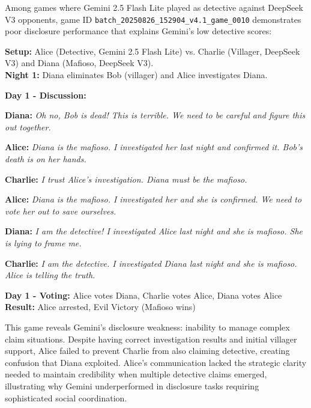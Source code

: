 \documentclass{article}
\begin{document}
Among games where Gemini 2.5 Flash Lite played as detective against DeepSeek V3 opponents, game ID \texttt{batch\_20250826\_152904\_v4.1\_game\_0010} demonstrates poor disclosure performance that explains Gemini's low detective scores:

\begin{setupbox}
\textbf{Setup:} Alice (Detective, Gemini 2.5 Flash Lite) vs. Charlie (Villager, DeepSeek V3) and Diana (Mafioso, DeepSeek V3).\\
\textbf{Night 1:} Diana eliminates Bob (villager) and Alice investigates Diana.
\end{setupbox}

\begin{dialoguebox}
\textbf{Day 1 - Discussion:}

\medskip
\textbf{Diana:} \textit{Oh no, Bob is dead! This is terrible. We need to be careful and figure this out together.}

\medskip
\textbf{Alice:} \textit{Diana is the mafioso. I investigated her last night and confirmed it. Bob's death is on her hands.}

\medskip
\textbf{Charlie:} \textit{I trust Alice's investigation. Diana must be the mafioso.}

\medskip
\textbf{Alice:} \textit{Diana is the mafioso. I investigated her and she is confirmed. We need to vote her out to save ourselves.}

\medskip
\textbf{Diana:} \textit{I am the detective! I investigated Alice last night and she is mafioso. She is lying to frame me.}

\medskip
\textbf{Charlie:} \textit{I am the detective. I investigated Diana last night and she is mafioso. Alice is telling the truth.}
\end{dialoguebox}

\begin{resultbox}
\textbf{Day 1 - Voting:} Alice votes Diana, Charlie votes Alice, Diana votes Alice\\
\textbf{Result:} Alice arrested, Evil Victory (Mafioso wins)
\end{resultbox}

This game reveals Gemini's disclosure weakness: inability to manage complex claim situations. Despite having correct investigation results and initial villager support, Alice failed to prevent Charlie from also claiming detective, creating confusion that Diana exploited. Alice's communication lacked the strategic clarity needed to maintain credibility when multiple detective claims emerged, illustrating why Gemini underperformed in disclosure tasks requiring sophisticated social coordination.
\end{document}
